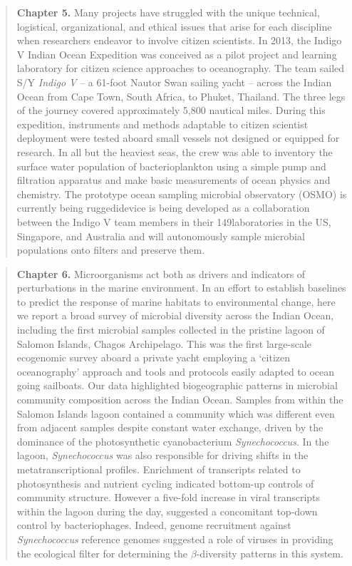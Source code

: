 \begin{quote}
\noindent\textbf{Chapter 5.} Many projects have struggled with the unique
technical, logistical, organizational, and ethical issues that arise for each
discipline when researchers endeavor to involve citizen scientists. In 2013,
the Indigo V Indian Ocean Expedition was conceived as a pilot project and
learning laboratory for citizen science approaches to oceanography. The team
sailed S/Y {\em Indigo V} -- a 61-foot Nautor Swan sailing yacht -- across the
Indian Ocean from Cape Town, South Africa, to Phuket, Thailand. The three legs
of the journey covered approximately 5,800 nautical miles. During this
expedition, instruments and methods adaptable to citizen scientist deployment
were tested aboard small vessels not designed or equipped for research. In all
but the heaviest seas, the crew was able to inventory the surface water
population of bacterioplankton using a simple pump and filtration apparatus
and make basic measurements of ocean physics and chemistry. The prototype
ocean sampling microbial observatory (OSMO) is currently being ruggedidevice
is being developed as a collaboration between the Indigo V team members in
their 149laboratories in the US, Singapore, and Australia and will
autonomously sample microbial populations onto filters and preserve them.
\end{quote}

\begin{quote}
\noindent\textbf{Chapter 6.} Microorganisms act both as drivers and indicators
of perturbations in the marine environment. In an effort to establish
baselines to predict the response of marine habitats to environmental change,
here we report a broad survey of microbial diversity across the Indian Ocean,
including the first microbial samples collected in the pristine lagoon of
Salomon Islands, Chagos Archipelago. This was the first large-scale ecogenomic
survey aboard a private yacht employing a `citizen oceanography' approach and
tools and protocols easily adapted to ocean going sailboats. Our data
highlighted biogeographic patterns in microbial community composition across
the Indian Ocean. Samples from within the Salomon Islands lagoon contained a
community which was different even from adjacent samples despite constant
water exchange, driven by the dominance of the photosynthetic cyanobacterium
{\em Synechococcus}. In the lagoon, {\em Synechococcus} was also responsible
for driving shifts in the metatranscriptional profiles. Enrichment of
transcripts related to photosynthesis and nutrient cycling indicated bottom-up
controls of community structure. However a five-fold increase in viral
transcripts within the lagoon during the day, suggested a concomitant top-down
control by bacteriophages. Indeed, genome recruitment against {\em
Synechococcus} reference genomes suggested a role of viruses in providing the
ecological filter for determining the $\beta$-diversity patterns in this
system.
\end{quote}

